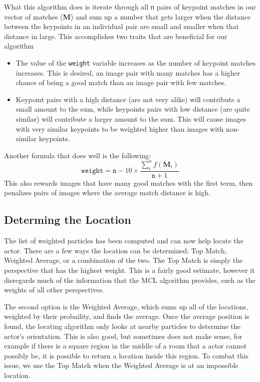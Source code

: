 \documentclass[a4paper,11pt]{article}
\begin{document}
What this algorithm does is iterate through all \texttt{n} pairs of keypoint matches in our vector of matches (\textbf{M}) and sum up a number that gets larger when the distance between the keypoints in an individual pair are small and smaller when that distance in large. This accomplishes two traits that are beneficial for our algorithm
\begin{itemize}
  \item The value of the \texttt{weight} variable increases as the number of keypoint matches increases. This is desired, an image pair with many matches has a higher chance of being a good match than an image pair with few matches.
  \item Keypoint pairs with a high distance (are not very alike) will contribute a small amount to the sum, while keypoints pairs with low distance (are quite similar) will contribute a larger amount to the sum. This will cause images with very similar keypoints to be weighted higher than images with non-similar keypoints.
\end{itemize}

Another formula that does well is the following:
\[
\mathtt{weight} = \mathtt{n} - 10 \times \frac{\sum_{i}^{n} f(\boldsymbol{M}_i)}{\mathtt{n} + 1}
\]
This also rewards images that have many good matches with the first term, then penalizes pairs of images where the average match distance is high.

\subsection{Determing the Location}
The list of weighted particles has been computed and can now help locate the actor. There are a few ways the location can be determined: Top Match, Weighted Average, or a combination of the two. The Top Match is simply the perspective that has the highest weight. This is a fairly good estimate, however it disregards much of the information that the MCL algorithm provides, such as the weights of all other perspectives. 

The second option is the Weighted Average, which sums up all of the locations, weighted by their probaility, and finds the average. Once the average position is found, the locating algorithm only looks at nearby particles to determine the actor's orientation. This is also good, but sometimes does not make sense, for example if there is a square region in the middle of a room that a actor cannot possibly be, it is possible to return a location inside this region. To combat this issue, we use the Top Match when the Weighted Average is at an impossible location.
\end{document}
